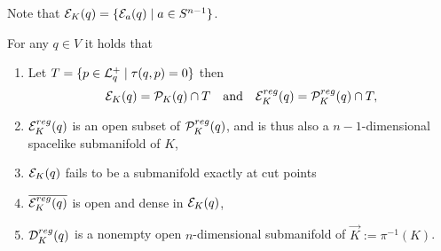 Note that ${\mathcal{E}}_K(q) = \{ {\mathcal{E}}_a(q) \mid a\in {S^{n-1}} \}$.
\begin{proposition}\label{prop:submanifolds}
For any $q\in V$ it holds that
\begin{enumerate}[label={\textnormal{(\arabic*)}}]
    \item Let $T=\{p\in {\mathcal{L}}^+_q \mid \tau(q,p)=0\}$ then 
    \[
        {\mathcal{E}}_K(q) = {\mathcal{P}}_K(q) \cap T \quad \text{and} \quad {\mathcal{E}}^{reg}_K(q) = {\mathcal{P}}^{reg}_K(q) \cap T,
    \]
    \item  ${\mathcal{E}}^{reg}_K(q)$ is an open subset of ${\mathcal{P}}^{reg}_K(q)$, and is thus also a $n-1$-dimensional spacelike submanifold of $K$,
    \item ${\mathcal{E}}_K(q)$ fails to be a submanifold exactly at cut points
    \item $\overline{{\mathcal{E}}^{reg}_K(q)}$ is open and dense in ${\mathcal{E}}_K(q)$,
    \item ${\mathcal{D}}^{reg}_K(q)$ is a nonempty open $n$-dimensional submanifold of $\overrightarrow{K}:=\pi^{-1}(K)$.
\end{enumerate}
\end{proposition}
